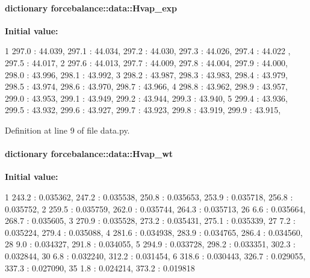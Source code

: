\hypertarget{namespaceforcebalance_1_1data_acf4e892b022db3fee4b5fd4c9ce3f13f}{
\paragraph[{\-Hvap\-\_\-exp}]{\setlength{\rightskip}{0pt plus 5cm}dictionary {\bf forcebalance\-::data\-::\-Hvap\-\_\-exp}}}\label{namespaceforcebalance_1_1data_acf4e892b022db3fee4b5fd4c9ce3f13f}
{\bfseries \-Initial value\-:}
\begin{DoxyCode}
1 {297.0 : 44.039, 297.1 : 44.034, 297.2 : 44.030, 297.3 : 44.026, 297.4 : 44.022
      , 297.5 : 44.017,
2                         297.6 : 44.013, 297.7 : 44.009, 297.8 : 44.004, 297.9 :
       44.000, 298.0 : 43.996, 298.1 : 43.992,
3                         298.2 : 43.987, 298.3 : 43.983, 298.4 : 43.979, 298.5 :
       43.974, 298.6 : 43.970, 298.7 : 43.966,
4                         298.8 : 43.962, 298.9 : 43.957, 299.0 : 43.953, 299.1 :
       43.949, 299.2 : 43.944, 299.3 : 43.940,
5                         299.4 : 43.936, 299.5 : 43.932, 299.6 : 43.927, 299.7 :
       43.923, 299.8 : 43.919, 299.9 : 43.915, }
\end{DoxyCode}


\-Definition at line 9 of file data.\-py.

\hypertarget{namespaceforcebalance_1_1data_aef2b70671bb97513a6bfd4e85e6b7a04}{
\paragraph[{\-Hvap\-\_\-wt}]{\setlength{\rightskip}{0pt plus 5cm}dictionary {\bf forcebalance\-::data\-::\-Hvap\-\_\-wt}}}\label{namespaceforcebalance_1_1data_aef2b70671bb97513a6bfd4e85e6b7a04}
{\bfseries \-Initial value\-:}
\begin{DoxyCode}
1 {243.2 : 0.035362, 247.2 : 0.035538, 250.8 : 0.035653, 253.9 : 0.035718, 256.8 
      : 0.035752, 
2                        259.5 : 0.035759, 262.0 : 0.035744, 264.3 : 0.035713, 26
      6.6 : 0.035664, 268.7 : 0.035605, 
3                        270.9 : 0.035528, 273.2 : 0.035431, 275.1 : 0.035339, 27
      7.2 : 0.035224, 279.4 : 0.035088, 
4                        281.6 : 0.034938, 283.9 : 0.034765, 286.4 : 0.034560, 28
      9.0 : 0.034327, 291.8 : 0.034055, 
5                        294.9 : 0.033728, 298.2 : 0.033351, 302.3 : 0.032844, 30
      6.8 : 0.032240, 312.2 : 0.031454, 
6                        318.6 : 0.030443, 326.7 : 0.029055, 337.3 : 0.027090, 35
      1.8 : 0.024214, 373.2 : 0.019818}
\end{DoxyCode}


